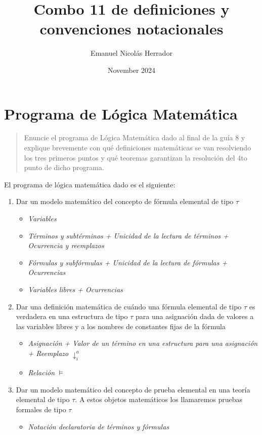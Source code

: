 \documentclass{article}
\title{Combo 11 de definiciones y convenciones notacionales}
\author{Emanuel Nicolás Herrador}
\date{November 2024}
\begin{document}
\maketitle

\section{Programa de Lógica Matemática}
\begin{quote}
  Enuncie el programa de Lógica Matemática dado al final de la guía $8$ y explique brevemente con qué definiciones matemáticas se van resolviendo los tres primeros puntos y qué teoremas garantizan la resolución del 4to punto de dicho programa.
\end{quote}
El programa de lógica matemática dado es el siguiente:
\begin{enumerate}
  \item Dar un modelo matemático del concepto de fórmula elemental de tipo $\tau$
        \begin{itemize}
          \item \textit{Variables}
          \item \textit{Términos y subtérminos + Unicidad de la lectura de términos + Ocurrencia y reemplazos}
          \item \textit{Fórmulas y subfórmulas + Unicidad de la lectura de fórmulas + Ocurrencias}
          \item \textit{Variables libres + Ocurrencias}
        \end{itemize}
  \item Dar una definición matemática de cuándo una fórmula elemental de tipo $\tau$ es verdadera en una estructura de tipo $\tau$ para una asignación dada de valores a las variables libres y a los nombres de constantes fijas de la fórmula
        \begin{itemize}
          \item \textit{Asignación + Valor de un término en una estructura para una asignación + Reemplazo} $\downarrow^a_i$
          \item \textit{Relación} $\vDash$
        \end{itemize}
  \item Dar un modelo matemático del concepto de prueba elemental en una teoría elemental de tipo $\tau$. A estos objetos matemáticos los llamaremos pruebas formales de tipo $\tau$
        \begin{itemize}
          \item \textit{Notación declaratoria de términos y fórmulas}

\end{itemize}
\end{enumerate}
\end{document}
